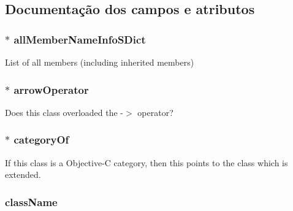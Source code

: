 \subsection{Documentação dos campos e atributos}
\hypertarget{class_class_def_impl_aa8f99065fcaf7b17dadea395ff119e81}{
\subsubsection[{all\-Member\-Name\-Info\-S\-Dict}]{$\ast$ all\-Member\-Name\-Info\-S\-Dict}}\label{class_class_def_impl_aa8f99065fcaf7b17dadea395ff119e81}
List of all members (including inherited members) \hypertarget{class_class_def_impl_afb944a90be4237de66127e07bf39d20a}{
\subsubsection[{arrow\-Operator}]{$\ast$ arrow\-Operator}}\label{class_class_def_impl_afb944a90be4237de66127e07bf39d20a}
Does this class overloaded the -\/$>$ operator? \hypertarget{class_class_def_impl_a8baa5a129ba0c7fca0f16f8941cd2572}{
\subsubsection[{category\-Of}]{$\ast$ category\-Of}}\label{class_class_def_impl_a8baa5a129ba0c7fca0f16f8941cd2572}
If this class is a Objective-\/\-C category, then this points to the class which is extended. \hypertarget{class_class_def_impl_aa9c1e1c77226f1a726988c0e07634265}{
\subsubsection[{class\-Name}]{ class\-Name}}\label{class_class_def_impl_aa9c1e1c77226f1a726988c0e07634265}
